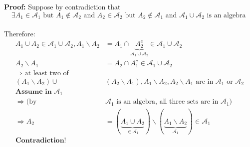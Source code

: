 \textbf{Proof:}
Suppose by contradiction that $$\exists A_1\in\mathcal{A}_1\text{ but } A_1\notin \mathcal{A}_2 \text{ and } A_2\in \mathcal{A}_2\text{ but } A_2\notin \mathcal{A}_1 \text{ and } \mathcal{A}_1\cup\mathcal{A}_2 \text{ is an algebra }$$
\\Therefore:
\begin{align*}
    A_1\cup A_2\in \mathcal{A}_1\cup\mathcal{A}_2, A_1\backslash A_2&=A_1\cap \underbrace{A_2^c}_{\mathcal{A}_1\cup\mathcal{A}_2}\in \mathcal{A}_1\cup\mathcal{A}_2
    \\A_2\backslash A_1&=A_2\cap {A_1^c}\in \mathcal{A}_1\cup\mathcal{A}_2
    \\\Rightarrow \text{ at least two of } 
\\(A_1\backslash A_2)\cup &(A_2\backslash A_1),A_1\backslash A_2,A_2\backslash A_1 \text{ are in } \mathcal{A}_1 \text{ or }\mathcal{A}_2
\\\textbf{Assume in } \mathcal{A}_1
\\\Rightarrow (\text{by } &\mathcal{A}_1 \text{ is an algebra, all three sets are in } \mathcal{A}_1)
\\\Rightarrow A_2&=(\underbrace{A_1\cup A_2}_{\in \mathcal{A}_1})\backslash(\underbrace{A_1\backslash A_2}_{\mathcal{A}_1})\in \mathcal{A}_1
\\\textbf{Contradiction!}
\end{align*}
